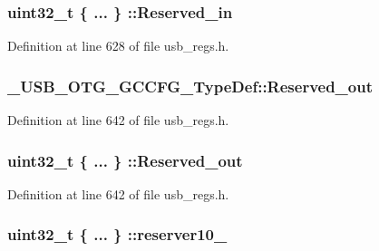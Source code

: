 \hypertarget{group___u_s_b___o_t_g___d_r_i_v_e_r_gaa92dfa4a0a3dbe9f80eac2a7f4568207}{
\subsubsection[{Reserved\-\_\-in}]{\setlength{\rightskip}{0pt plus 5cm}uint32\-\_\-t \{ ... \} \-::Reserved\-\_\-in}}\label{group___u_s_b___o_t_g___d_r_i_v_e_r_gaa92dfa4a0a3dbe9f80eac2a7f4568207}


Definition at line 628 of file usb\-\_\-regs.\-h.

\hypertarget{group___u_s_b___o_t_g___d_r_i_v_e_r_gaca2c301103053094f91770ac5b6ddfc7}{
\subsubsection[{Reserved\-\_\-out}]{ \-\_\-\-U\-S\-B\-\_\-\-O\-T\-G\-\_\-\-G\-C\-C\-F\-G\-\_\-\-Type\-Def\-::\-Reserved\-\_\-out}}\label{group___u_s_b___o_t_g___d_r_i_v_e_r_gaca2c301103053094f91770ac5b6ddfc7}


Definition at line 642 of file usb\-\_\-regs.\-h.

\hypertarget{group___u_s_b___o_t_g___d_r_i_v_e_r_ga3296f9705258ce1813e3524a7da9951c}{
\subsubsection[{Reserved\-\_\-out}]{\setlength{\rightskip}{0pt plus 5cm}uint32\-\_\-t \{ ... \} \-::Reserved\-\_\-out}}\label{group___u_s_b___o_t_g___d_r_i_v_e_r_ga3296f9705258ce1813e3524a7da9951c}


Definition at line 642 of file usb\-\_\-regs.\-h.

\hypertarget{group___u_s_b___o_t_g___d_r_i_v_e_r_ga555294ba60a03dd6884aa60e250a0ae9}{
\subsubsection[{reserver10\-\_\-16}]{\setlength{\rightskip}{0pt plus 5cm}uint32\-\_\-t \{ ... \} \-::reserver10\-\_}}\label{group___u_s_b___o_t_g___d_r_i_v_e_r_ga555294ba60a03dd6884aa60e250a0ae9}


